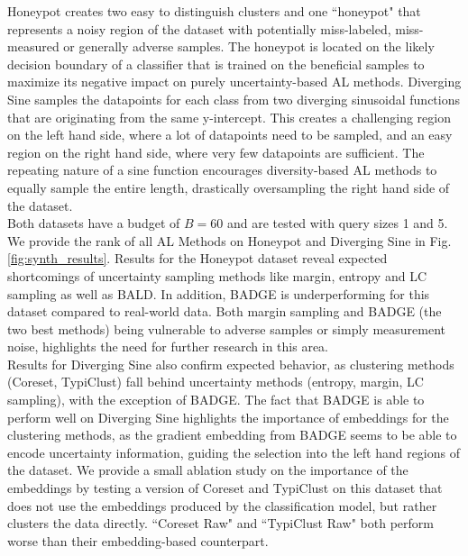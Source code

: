 \documentclass[]{article}
\begin{document}
%
Honeypot creates two easy to distinguish clusters and one ``honeypot" that represents a noisy region of the dataset with potentially miss-labeled, miss-measured or generally adverse samples.
The honeypot is located on the likely decision boundary of a classifier that is trained on the beneficial samples to maximize its negative impact on purely uncertainty-based AL methods.
Diverging Sine samples the datapoints for each class from two diverging sinusoidal functions that are originating from the same y-intercept.
This creates a challenging region on the left hand side, where a lot of datapoints need to be sampled, and an easy region on the right hand side, where very few datapoints are sufficient. 
The repeating nature of a sine function encourages diversity-based AL methods to equally sample the entire length, drastically oversampling the right hand side of the dataset. \\
Both datasets have a budget of $B=60$ and are tested with query sizes 1 and 5. \\[1mm]
We provide the rank of all AL Methods on Honeypot and Diverging Sine in Fig. \ref{fig:synth_results}.
Results for the Honeypot dataset reveal expected shortcomings of uncertainty sampling methods like margin, entropy and LC sampling as well as BALD.
In addition, BADGE is underperforming for this dataset compared to real-world data. 
Both margin sampling and BADGE (the two best methods) being vulnerable to adverse samples or simply measurement noise, highlights the need for further research in this area. \\
%
Results for Diverging Sine also confirm expected behavior, as clustering methods (Coreset, TypiClust) fall behind uncertainty methods (entropy, margin, LC sampling), with the exception of BADGE. 
The fact that BADGE is able to perform well on Diverging Sine highlights the importance of embeddings for the clustering methods, as the gradient embedding from BADGE seems to be able to encode uncertainty information, guiding the selection into the left hand regions of the dataset. 
We provide a small ablation study on the importance of the embeddings by testing a version of Coreset and TypiClust on this dataset that does not use the embeddings produced by the classification model, but rather clusters the data directly.
``Coreset Raw" and ``TypiClust Raw" both perform worse than their embedding-based counterpart.
\end{document}
